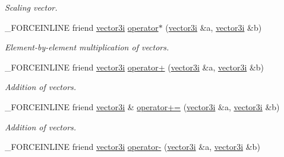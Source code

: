 \begin{DoxyCompactItemize}
\begin{DoxyCompactList}\small\item\em Scaling vector. \end{DoxyCompactList}\item 
\hypertarget{classbt_1_1vector3i_a5f5f008c198f76ff3e8d6db9eca26312}{\-\_\-\-F\-O\-R\-C\-E\-I\-N\-L\-I\-N\-E friend \hyperlink{classbt_1_1vector3i}{vector3i} \hyperlink{classbt_1_1vector3i_a5f5f008c198f76ff3e8d6db9eca26312}{operator$\ast$} (\hyperlink{classbt_1_1vector3i}{vector3i} \&a, \hyperlink{classbt_1_1vector3i}{vector3i} \&b)}\label{classbt_1_1vector3i_a5f5f008c198f76ff3e8d6db9eca26312}

\begin{DoxyCompactList}\small\item\em Element-\/by-\/element multiplication of vectors. \end{DoxyCompactList}\item 
\hypertarget{classbt_1_1vector3i_a9d01c9a80169c6506cd32e67334b017d}{\-\_\-\-F\-O\-R\-C\-E\-I\-N\-L\-I\-N\-E friend \hyperlink{classbt_1_1vector3i}{vector3i} \hyperlink{classbt_1_1vector3i_a9d01c9a80169c6506cd32e67334b017d}{operator+} (\hyperlink{classbt_1_1vector3i}{vector3i} \&a, \hyperlink{classbt_1_1vector3i}{vector3i} \&b)}\label{classbt_1_1vector3i_a9d01c9a80169c6506cd32e67334b017d}

\begin{DoxyCompactList}\small\item\em Addition of vectors. \end{DoxyCompactList}\item 
\hypertarget{classbt_1_1vector3i_acd27f1088102d2e2da150cfef8ffbc3b}{\-\_\-\-F\-O\-R\-C\-E\-I\-N\-L\-I\-N\-E friend \hyperlink{classbt_1_1vector3i}{vector3i} \& \hyperlink{classbt_1_1vector3i_acd27f1088102d2e2da150cfef8ffbc3b}{operator+=} (\hyperlink{classbt_1_1vector3i}{vector3i} \&a, \hyperlink{classbt_1_1vector3i}{vector3i} \&b)}\label{classbt_1_1vector3i_acd27f1088102d2e2da150cfef8ffbc3b}

\begin{DoxyCompactList}\small\item\em Addition of vectors. \end{DoxyCompactList}\item 
\hypertarget{classbt_1_1vector3i_a5b9e3006451456708888befd4bb646ac}{\-\_\-\-F\-O\-R\-C\-E\-I\-N\-L\-I\-N\-E friend \hyperlink{classbt_1_1vector3i}{vector3i} \hyperlink{classbt_1_1vector3i_a5b9e3006451456708888befd4bb646ac}{operator-\/} (\hyperlink{classbt_1_1vector3i}{vector3i} \&a, \hyperlink{classbt_1_1vector3i}{vector3i} \&b)}\label{classbt_1_1vector3i_a5b9e3006451456708888befd4bb646ac}


\end{DoxyCompactItemize}

